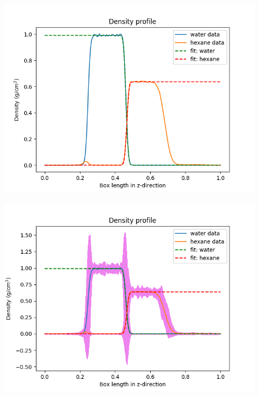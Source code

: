 \documentclass[12pt,reqno]{amsart}
\numberwithin{equation}{section}
\begin{document}
\begin{enumerate}
\begin{figure}[H]
\centering
\includegraphics[scale=0.6]{interface_density_profile_individualfit_NVTequil-16bead-long-noSE}
\end{figure}

\begin{figure}[H]
\centering
\includegraphics[scale=0.6]{interface_density_profile_individualfit_NVTequil-16bead-long}
\end{figure}


\end{enumerate}
\end{document}
